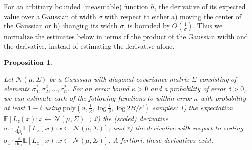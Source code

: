 \documentclass[11pt,letter]{article}
\newcommand{\Exp}{\mathbb{E}}
\renewcommand{\poly}{\mathrm{poly}}
\newcommand{\Normal}{\mathcal{N}}
\renewcommand{\d}{\mathrm{d}}
\newcommand{\Diff}[2][]{\frac{\d#1}{\d#2}}
\newcounter{nTheorems}
\numberwithin{nTheorems}{section}
\newtheorem{proposition}[nTheorems]{Proposition}
\begin{document}
For an arbitrary bounded (measurable) function $h$, the derivative of its expected value over a Gaussian of width $\sigma$ with respect to either a) moving the center of the Gaussian or b) changing its width $\sigma$, is bounded by $O(\frac{1}{\sigma})$. Thus we normalize the estimates below in terms of the product of the Gaussian width and the derivative, instead of estimating the derivative alone.



\begin{proposition}\label{prop:Sampling}

  Let $\Normal(\mu,\Sigma)$ be a Gaussian with diagonal covariance matrix $\Sigma$ consisting of elements $\sigma_1^2,\sigma_2^2,\ldots,\sigma_n^2$.
  For an error bound $\kappa>0$ and a probability of error $\delta>0$, we can estimate each of the following functions to within error $\kappa$ with probability at least $1-\delta$ using $\poly(n,\frac{1}{\kappa},\log\frac{1}{\delta},\log 2B/\epsilon')$ samples: 1) the expectation $\Exp[L_z(x):x\leftarrow \mathcal{N}(\mu,\Sigma)]$; 2) the (scaled) derivative $\sigma_1\cdot\Diff{\mu_1} \Exp[L_z(x):x\leftarrow \mathcal{N}(\mu,\Sigma)]$; and 3) the derivative with respect to scaling $\sigma_1\cdot\Diff{\sigma_1} \Exp[L_z(x):x\leftarrow \mathcal{N}(\mu,\Sigma)]$. \emph{A fortiori}, these derivatives exist.
\end{proposition}
\end{document}
